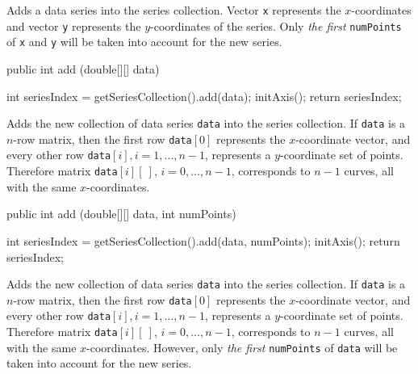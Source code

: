 \begin{tabb}
   Adds a data series into the series collection. Vector \texttt{x} represents
   the $x$-coordinates and vector \texttt{y} represents the $y$-coordinates of
   the series. Only \emph{the first} \texttt{numPoints} of \texttt{x} and
   \texttt{y} will be taken into account for the new series.
\end{tabb}
\begin{htmlonly}
\end{htmlonly}
\begin{code}

   public int add (double[][] data) \begin{hide} {
      int seriesIndex = getSeriesCollection().add(data);
      initAxis();
      return seriesIndex;
   }\end{hide}
\end{code}
\begin{tabb}
   Adds the new collection of data series \texttt{data} into the series collection.
   If \texttt{data} is a $n$-row matrix,
 then the first row \texttt{data}$[0]$ represents the
 $x$-coordinate vector, and every other row \texttt{data}$[i],
   i=1,\ldots, n-1$, represents a $y$-coordinate set of points.
  Therefore matrix \texttt{data}$[i][\ ]$, $i=0,\ldots, n-1$,  corresponds
   to $n-1$ curves, all with the same $x$-coordinates.
\end{tabb}
\begin{htmlonly}
\end{htmlonly}
\begin{code}

   public int add (double[][] data, int numPoints) \begin{hide} {
      int seriesIndex = getSeriesCollection().add(data, numPoints);
      initAxis();
      return seriesIndex;
   }\end{hide}
\end{code}
\begin{tabb}
   Adds the new collection of data series \texttt{data} into the series collection.
   If \texttt{data} is a $n$-row matrix,
 then the first row \texttt{data}$[0]$ represents the
 $x$-coordinate vector, and every other row \texttt{data}$[i],
   i=1,\ldots, n-1$, represents a $y$-coordinate set of points.
  Therefore matrix \texttt{data}$[i][\ ]$, $i=0,\ldots, n-1$,  corresponds
   to $n-1$ curves, all with the same $x$-coordinates.
  However, only \emph{the first} \texttt{numPoints} of \texttt{data} will
  be taken into account for the new series.
\end{tabb}
